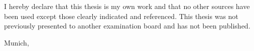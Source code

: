 \vspace*{150mm}

I hereby declare that this thesis is my own work and that no other sources have been used
except those clearly indicated and referenced. This thesis was not previously presented
to another examination board and has not been published.
\bigskip

Munich, 